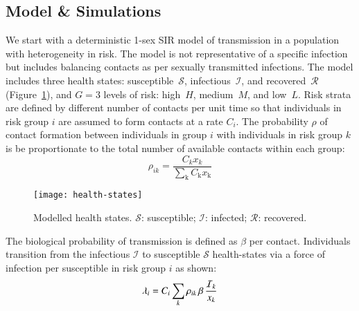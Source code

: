 \subsection{Model \& Simulations}\label{ss:model-sim}
We start with a deterministic 1-sex SIR model of transmission %
in a population with heterogeneity in risk.
The model is not representative of a specific infection but includes balancing contacts %
as per sexually transmitted infections.
The model includes three health states:
susceptible~$\mathcal{S}$, infectious~$\mathcal{I}$, and recovered~$\mathcal{R}$
(Figure~\ref{fig:health-states}),
and $G = 3$ levels of risk:
high~$H$, medium~$M$, and low~$L$.
Risk strata are defined by different number of contacts per unit time
so that individuals in risk group $i$ are assumed to
form contacts at a rate $C_{i}$.
The probability $\rho$ of contact formation between individuals in group $i$
with individuals in risk group $k$ is
be proportionate to the total number of available contacts within each group: 
\begin{equation}
  \rho_{ik} = \frac 
    {C_k x_k}
    {\sum_{\mathrm{k}}C_{\mathrm{k}} x_{\mathrm{k}}}
    \label{eq:rho}
\end{equation}
\begin{figure}
  \centering
  \texttt{[image: health-states]}
  \caption{Modelled health states.
  $\mathcal{S}$: susceptible;
  $\mathcal{I}$: infected;
  $\mathcal{R}$: recovered.}
  \label{fig:health-states}
\end{figure}
\par
The biological probability of transmission is defined as $\beta$ per contact. 
Individuals transition from the infectious $\mathcal{I}$ to susceptible $\mathcal{S}$ health-states  %
via a force of infection per susceptible in risk group $i$
as shown:
\begin{equation}
  \lambda_{i} =
  C_{i} \sum_k \rho_{ik} \thinspace  \beta \thinspace \frac{\mathcal{I}_k}{x_k}
  \label{eq:foi}
\end{equation}


